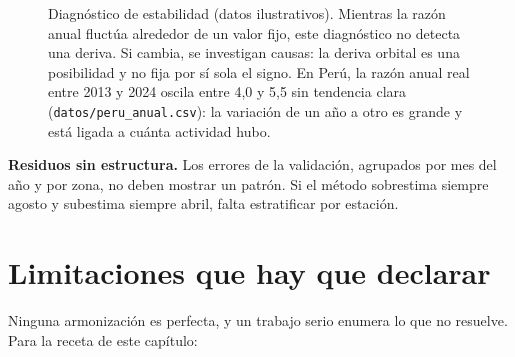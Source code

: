 \begin{figure}[ht]
\centering
{}
\caption{Diagnóstico de estabilidad (datos ilustrativos). Mientras la razón anual fluctúa
alrededor de un valor fijo, este diagnóstico no detecta una deriva. Si cambia, se
investigan causas: la deriva orbital es una posibilidad y no fija por sí sola el signo. En
Perú, la razón anual real entre 2013 y 2024 oscila entre 4,0 y 5,5 sin tendencia clara
(\texttt{datos/peru\_anual.csv}): la variación de un año a otro es grande y está ligada a
cuánta actividad hubo.}
\label{fig:estabilidad}
\end{figure}

\textbf{Residuos sin estructura.} Los errores de la validación, agrupados por mes del año y por
zona, no deben mostrar un patrón. Si el método sobrestima siempre agosto y subestima siempre
abril, falta estratificar por estación.

\section{Limitaciones que hay que declarar}

Ninguna armonización es perfecta, y un trabajo serio enumera lo que no resuelve. Para la receta
de este capítulo:

